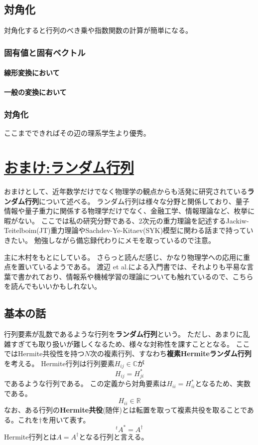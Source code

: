 \documentclass[10pt]{jsreport}
\theoremstyle{definition}%
\numberwithin{equation}{section}%
\begin{document}
\section{対角化}
対角化すると行列のべき乗や指数関数の計算が簡単になる。
\subsection{固有値と固有ベクトル}
\subsubsection{線形変換において}
\subsubsection{一般の変換において}
\subsection{対角化}
ここまでできればその辺の理系学生より優秀。

\appendix
\chapter{\underline{おまけ:ランダム行列}}
おまけとして、近年数学だけでなく物理学の観点からも活発に研究されている{\bf ランダム行列}について述べる。
ランダム行列は様々な分野と関係しており、量子情報や量子重力に関係する物理学だけでなく、金融工学、情報理論など、枚挙に暇がない。
ここでは私の研究分野である、2次元の重力理論を記述するJackiw-Teitelboim(JT)重力理論やSachdev-Ye-Kitaev(SYK)模型に関わる話まで持っていきたい。
勉強しながら備忘録代わりにメモを取っているので注意。

主に木村\cite{randam-kimura}をもとにしている。
さらっと読んだ感じ、かなり物理学への応用に重点を置いているようである。
渡辺 et al.による入門書\cite{randam-wnktn}では、それよりも平易な言葉で書かれており、情報系や機械学習の理論についても触れているので、こちらを読んでもいいかもしれない。
\section{基本の話}
行列要素が乱数であるような行列を{\bf ランダム行列}という。
ただし、あまりに乱雑すぎても取り扱いが難しくなるため、様々な対称性を課すこととなる。
ここではHermite共役性を持つ$N$次の複素行列、すなわち{\bf 複素Hermiteランダム行列}を考える。
Hermite行列は行列要素$H_{ij}\in \mathbb{C}$が
\begin{equation}
  H_{ij}=H_{ji}^{*}
\end{equation}
であるような行列である。
この定義から対角要素は$H_{ii}=H_{ii}^{*}$となるため、実数である。
\begin{equation}
  H_{ii}\in \mathbb{R}
\end{equation}
なお、ある行列の{\bf Hermite共役}(随伴)とは転置を取って複素共役を取ることである。これを$\dagger$を用いて表す。
\begin{equation}
  {}^{t}\!A^{*}=A^{\dagger}
\end{equation}
Hermite行列とは$A=A^{\dagger}$となる行列と言える。
\end{document}
